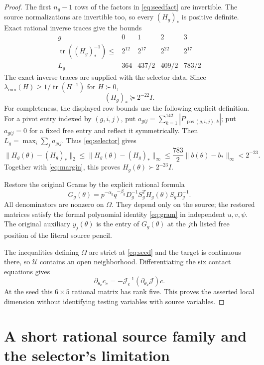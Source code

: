 \documentclass[11pt]{article}
\DeclareMathOperator{\tr}{tr}
\begin{document}
\begin{proof}
The first $n_g-1$ rows of the factors in \eqref{eq:seedfact} are invertible.
The source normalizations are invertible too, so every $(H_g)_*$ is
positive definite.  Exact rational inverse traces give the bounds
\[
\begin{array}{c|rrrr}
g&0&1&2&3\\\hline
\tr((H_g)_*^{-1})\leq&2^{12}&2^{17}&2^{22}&2^{17}\\
L_g&364&437/2&409/2&783/2
\end{array}
\]
The exact inverse traces are supplied with the selector data.
Since $\lambda_{\min}(H)\geq1/\tr(H^{-1})$ for $H\succ0$,
\begin{equation}
 (H_g)_*\succeq2^{-22}I.
 \label{eq:margin}
\end{equation}
For completeness, the displayed row bounds use the following explicit
definition.  For a pivot entry indexed by $(g,i,j)$, put
$a_{gij}=\sum_{k=1}^{142}|P_{\operatorname{pos}(g,i,j),k}|$; put
$a_{gij}=0$ for a fixed free entry and reflect it symmetrically.
Then $L_g=\max_i\sum_j a_{gij}$.
Thus \eqref{eq:selector} gives
\[
 \|H_g(\theta)-(H_g)_*\|_2
 \leq\|H_g(\theta)-(H_g)_*\|_\infty
 \leq\frac{783}{2}\|b(\theta)-b_*\|_\infty<2^{-23}.
\]
Together with \eqref{eq:margin}, this proves
$H_g(\theta)\succ2^{-23}I$.

Restore the original Grams by the explicit rational formula
\begin{equation}
 G_g(\theta)=p^{-\alpha_g}q^{-\beta_g}
 D_g^{-1}S_g^TH_g(\theta)S_gD_g^{-1}.
 \label{eq:restore}
\end{equation}
All denominators are nonzero on $\Omega$.  They depend only on the
source; the restored matrices satisfy the formal polynomial identity
\eqref{eq:gram} in independent $u,v,\psi$.
The original auxiliary $y_j(\theta)$ is the entry of $G_g(\theta)$ at
the $j$th listed free position of the literal source pencil.

The inequalities defining $\Omega$ are strict at \eqref{eq:seed} and
the target is continuous there, so $\mathcal U$ contains an open
neighborhood.  Differentiating the six contact equations gives
\[
 \partial_{\theta_k}c_e
 =-\mathcal J_e^{-1}(\partial_{\theta_k}\mathcal J)c.
\]
At the seed this $6\times5$ rational matrix has rank five.  This proves
the asserted local dimension without identifying testing variables with
source variables.
\end{proof}

\section{A short rational source family and the selector's limitation}
\end{document}
